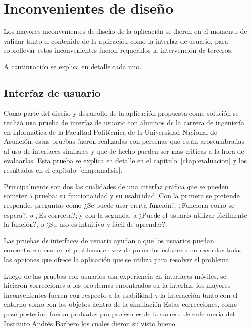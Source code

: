 \section{Inconvenientes de diseño}

Los mayores inconvenientes de diseño de la aplicación se dieron en el momento de
validar tanto el contenido de la aplicación como la interfaz de usuario, para
sobrellevar estos inconvenientes fueron requeridos la intervención de terceros.

A continuación se explica en detalle cada uno.

\subsection{Interfaz de usuario}

Como parte del diseño y desarrollo de la aplicación propuesta como solución se
realizó una prueba de interfaz de usuario con alumnos de la carrera de
ingeniería en informática de la Facultad Politécnica de la Universidad Nacional
de Asunción, estas pruebas fueron realizadas con personas que están
acostumbradas al uso de interfaces similares y que de hecho pueden ser mas
criticas a la hora de evaluarlas. Esta prueba se explica en detalle en el
capítulo~\ref{chap:evaluacion} y los resultados en el capítulo~\ref{chap:analisis}.

Principalmente son dos las cualidades de una interfaz gráfica que se pueden
someter a prueba: su funcionalidad y su usabilidad. Con la primera se pretende
responder preguntas como ¿Se puede usar cierta función?, ¿Funciona como se
espera?, o ¿Es correcta?; y con la segunda, a ¿Puede el usuario utilizar
fácilmente la función?, o ¿Su uso es intuitivo y fácil de
aprender?\cite{fragaverificacion}.

Las pruebas de interfaces de usuario ayudan a que los usuarios puedan
concentrarse mas en el problema en vez de poner los esfuerzos en recordar todas
las opciones que ofrece la aplicación que se utiliza para resolver el
problema\cite{horowitz1993graphical}.

Luego de las pruebas con usuarios con experiencia en interfaces móviles, se
hicieron correcciones a los problemas encontrados en la interfaz, los mayores
inconvenientes fueron con respecto a la usabilidad y la interacción tanto con el
entorno como con los objetos dentro de la simulación Estas correcciones, como
paso posterior, fueron probadas por profesores de la carrera de enfermería del
Instituto Andrés Barbero los cuales dieron su visto bueno.

